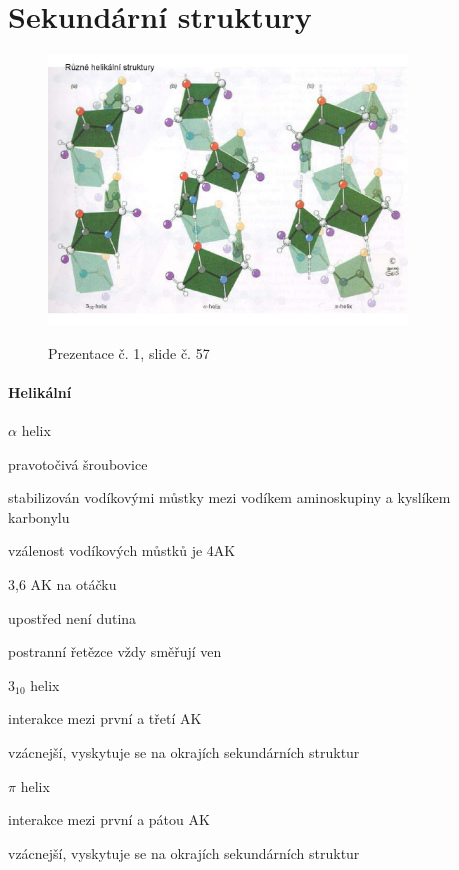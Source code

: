 \documentclass[DIV=8]{scrreprt}
\begin{document}
\section{Sekundární struktury} \label{Sekundární struktury} \FloatBarrier


\begin{figure}
    \caption{Prezentace č. 1, slide č. 57}
    \includegraphics[width=0.85\textwidth]{slides-1/slide-57.jpg}
    \centering
    \label{slides-1-slide-57}
\end{figure}

\paragraph{Helikální}
\begin{myItemize}[nosep]
    \item \(\alpha\) helix
\begin{myItemize}[nosep]
    \item pravotočivá šroubovice
    \item stabilizován vodíkovými můstky mezi vodíkem aminoskupiny a kyslíkem karbonylu
    \item vzálenost vodíkových můstků je 4AK
    \item 3,6 AK na otáčku
    \item upostřed není dutina
    \item postranní řetězce vždy směřují ven
\end{myItemize}

    \item \(3_{10}\) helix
\begin{myItemize}[nosep]
    \item interakce mezi první a třetí AK
    \item vzácnejší, vyskytuje se na okrajích sekundárních struktur
\end{myItemize}

    \item \(\pi\) helix
\begin{myItemize}[nosep]
    \item interakce mezi první a pátou AK
    \item vzácnejší, vyskytuje se na okrajích sekundárních struktur
\end{myItemize}

\end{myItemize}
\end{document}
